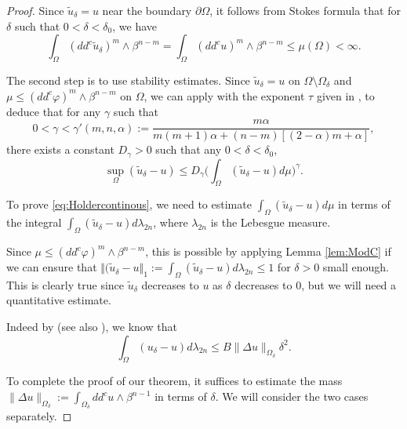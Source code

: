 \documentclass[11pt]{article}
\numberwithin{equation}{section}
\theoremstyle{definition}
\theoremstyle{plain}
\theoremstyle{definition}
\begin{document}
\begin{proof}
Since $\tilde u_\delta = u$ near the boundary $\partial \Omega$, it follows from Stokes formula that for $\delta$ such that $0 < \delta < \delta_0$, we have
\[
\int_{\Omega}(dd^c\tilde{u}_{\delta})^m\wedge\beta^{n-m} = \int_{\Omega}(dd^c u)^m\wedge\beta^{n-m} \leq \mu (\Omega) < \infty.
\]

The second step is to use stability estimates. Since $\tilde u_\delta = u$ on $\Omega \setminus \Omega_\delta$ and $\mu\leq (dd^c\varphi)^m\wedge\beta^{n-m}$ on $\Omega$, we can apply \cite[Prop.\,2.20]{BZ20} with the exponent $\tau$ given in \cite[Th.\,A]{BZ20}, to deduce that for any $\gamma$ such that
\[
0 <\gamma < \gamma' (m,n,\alpha):=
\frac{m \alpha}{ m (m + 1) \alpha + (n-m) [(2 - \alpha)m + \alpha]},
\]
there exists a constant $D_\gamma > 0$ such that any $0 < \delta < \delta_0$,
\begin{equation} \label{eq2}
\sup_{\Omega}(\tilde{u}_{\delta}-u) \leq D_{\gamma} \biggl(\int_{\Omega}(\tilde{u}_{\delta}-u) d\mu\biggr)^{\gamma}.
\end{equation}

To prove \eqref{eq:Holdercontinous}, we need to estimate $\int_{\Omega}(\tilde{u}_{\delta}-u) d\mu$ in terms of the integral \hbox{$\int_{\Omega}(\tilde{u}_{\delta}-u) d\lambda_{2n}$}, where $\lambda_{2n}$ is the Lebesgue measure.

Since $\mu \leq (dd^c \varphi)^m \wedge \beta^{n-m}$, this is possible by applying Lemma \ref{lem:ModC} if we can ensure that $\Vert (\tilde{u}_{\delta}-u \Vert_{1} := \int_{\Omega}(\tilde{u}_{\delta}-u) d\lambda_{2n} \leq 1$ for $\delta > 0$ small enough. This is clearly true since $\tilde{u}_\delta$ decreases to $ u$ as $\delta$ decreases to $0$, but we will need a quantitative estimate.

Indeed by \cite{GKZ08} (see also \cite[Lem.\,2.3]{BZ20}), we know that
\begin{equation} \label{eq3}
\int_{\Omega}({u}_{\delta}-u) d \lambda_{2 n} \leq B \|\Delta u\|_{\Omega_\delta}\delta^2.
\end{equation}

To complete the proof of our theorem, it suffices to estimate the mass $\|\Delta u\|_{\Omega_\delta} := \int_{\Omega_\delta} dd^c u \wedge \beta^{n-1}$ in terms of $\delta$.
We will consider the two cases separately.


\end{proof}
\end{document}
